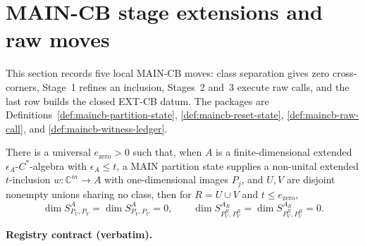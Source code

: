 \section{MAIN-CB stage extensions and raw moves}\label{sec:maincb-stage-extensions}
This section records five local MAIN-CB moves: class separation gives zero cross-corners,
Stage~1 refines an inclusion, Stages~2 and~3 execute raw calls, and the last row builds the
closed EXT-CB datum.  The packages are Definitions~\ref{def:maincb-partition-state}, \ref{def:maincb-reset-state}, \ref{def:maincb-raw-call}, and \ref{def:maincb-witness-ledger}.
\begin{lemma}\label{lem:maincb-cross-union-zero-corners}
There is a universal $e_{\mathrm{zero}}>0$ such that, when $A$ is a finite-dimensional
extended $\epsilon_A$-$C^*$-algebra with $\epsilon_A\le t$, a MAIN partition state supplies
a non-unital extended $t$-inclusion $w:\mathbb C^m\to A$ with one-dimensional images $P_j$,
and $U,V$ are disjoint nonempty unions sharing no class, then for $R=U\cup V$ and
$t\le e_{\mathrm{zero}}$,
\[
 \dim S^A_{P_U,P_V}=\dim S^A_{P_V,P_U}=0,\qquad
 \dim S^{A_R}_{P_U^R,P_V^R}=\dim S^{A_R}_{P_V^R,P_U^R}=0.
\]
\end{lemma}
\noindent\textbf{Registry contract (verbatim).}
